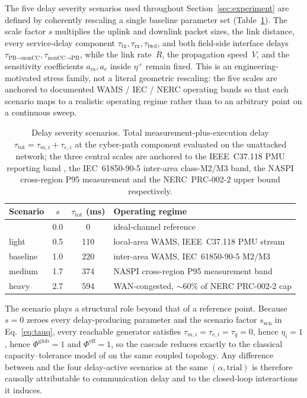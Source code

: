 The five delay severity scenarios used throughout
Section~\ref{sec:experiment} are defined by coherently rescaling a
single baseline parameter set (Table~\ref{tbl:scenarios_v3}).  The
scale factor $s$ multiplies the uplink and downlink packet sizes,
the link distance, every service-delay component
$\tau_{\text{tx}},\tau_{\text{rx}},\tau_{\text{fwd}}$, and both
field-side interface delays
$\tau_{\text{PB}\to\text{nonCC}},\tau_{\text{nonCC}\to\text{PB}}$,
while the link rate~$R$, the propagation speed~$V$, and the
sensitivity coefficients $a_m,a_e$ inside $\eta^{+}$ remain fixed.
This is an engineering-motivated stress family, not a literal
geometric rescaling: the five scales are anchored to documented
WAMS / IEC / NERC operating bands so that each scenario maps to a
realistic operating regime rather than to an arbitrary point on a
continuous sweep.

\begin{table}[t]
\caption{Delay severity scenarios.  Total measurement-plus-execution
delay $\tau_{\text{tot}}=\tau_{m,i}+\tau_{e,i}$ at the cyber-path
component evaluated on the unattacked network; the three central
scales are anchored to the IEEE~C37.118 PMU reporting band
\citep{IEEE_C37_118_2}, the IEC~61850-90-5 inter-area class-M2/M3
band, the NASPI cross-region P95 measurement
\citep{NASPI_LatencyGuidelines} and the NERC~PRC-002-2 upper
bound \citep{NERC_PRC002} respectively.}\label{tbl:scenarios_v3}
\centering
\begin{tabular}{@{}lccl@{}}
\toprule
Scenario & $s$ & $\tau_{\text{tot}}$ (ms) & Operating regime \\
\midrule
\nodelay{} & 0.0 &   0 & ideal-channel reference \\
light      & 0.5 & 110 & local-area WAMS, IEEE~C37.118 PMU stream \\
baseline   & 1.0 & 220 & inter-area WAMS, IEC~61850-90-5 M2/M3 \\
medium     & 1.7 & 374 & NASPI cross-region P95 measurement band \\
heavy      & 2.7 & 594 & WAN-congested, $\sim$60\% of NERC PRC-002-2 cap \\
\bottomrule
\end{tabular}
\end{table}

The \nodelay{} scenario plays a structural role beyond that of a
reference point.  Because $s=0$ zeroes every delay-producing
parameter and the scenario factor $s_{\text{scn}}$ in
Eq.~\eqref{eq:tauq}, every reachable generator satisfies
$\tau_{m,i}=\tau_{e,i}=\tau_q=0$, hence
$\eta_i=1$, hence $\Phi^{\text{glob}}=1$ and
$\Phi^{\text{eff}}=1$, so the cascade reduces exactly to the
classical capacity--tolerance model of \citet{Motter2002} on the
same coupled topology.  Any difference between
\nodelay{} and the four delay-active scenarios at the same
$(\alpha,\text{trial})$ is therefore causally attributable to
communication delay and to the closed-loop interactions it induces.

